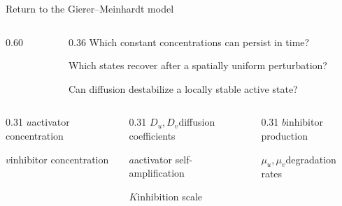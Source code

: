 \begin{frame}{Return to the Gierer--Meinhardt model}
\begin{columns}[c,onlytextwidth]
\begin{column}{0.60\textwidth}
    \end{column}

    \begin{column}{0.36\textwidth}
      \vspace{0.8cm}
        {Which constant concentrations can persist in time?}

      \vspace{-0.09cm}

        {Which states recover after a spatially uniform perturbation?}

      \vspace{-0.09cm}

        {Can diffusion destabilize a locally stable active state?}

    \end{column}

  \end{columns}

  \vspace{0.42cm}

  {\color{HydraWhite}\fontsize{7.2}{8.9}\selectfont
  \begin{columns}[T,onlytextwidth]

    \begin{column}{0.31\textwidth}
      \textcolor{HydraGold}{$u$}\quad activator concentration

      \vspace{0.10cm}

      \textcolor{HydraCyan}{$v$}\quad inhibitor concentration
    \end{column}

    \begin{column}{0.31\textwidth}
      \textcolor{HydraCyan}{$D_u,D_v$}\quad diffusion coefficients

      \vspace{0.10cm}

      \textcolor{HydraGold}{$a$}\quad activator self-amplification

      \vspace{0.10cm}

      \textcolor{HydraGold}{$K$}\quad inhibition scale
    \end{column}

    \begin{column}{0.31\textwidth}
      \textcolor{HydraGold}{$b$}\quad inhibitor production

      \vspace{0.10cm}

      \textcolor{HydraWhite}{$\mu_u,\mu_v$}\quad degradation rates
    \end{column}

  \end{columns}
  }

\end{frame}


